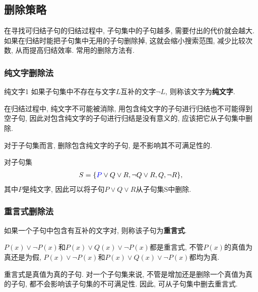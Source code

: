 \subsection{删除策略}
在寻找可归结子句的归结过程中, 子句集中的子句越多, 需要付出的代价就会越大. 如果在归结时能把子句集中无用的子句删除掉, 这就会缩小搜索范围, 减少比较次数, 从而提高归结效率.
常用的删除方法有.
\subsubsection{纯文字删除法}
\begin{mydef}{纯文字}{1}
    如果子句集中不存在与文字$L$互补的文字$\neg L$, 则称该文字为\textbf{纯文字}.
\end{mydef}

\begin{remark}
    在归结过程中, 纯文字不可能被消除, 用包含纯文字的子句进行归结也不可能得到空子句, 因此对包含纯文字的子句进行归结是没有意义的, 应该把它从子句集中删除.
\end{remark}
\begin{remark}
    对于子句集而言, 删除包含纯文字的子句, 是不影响其不可满足性的.
\end{remark}

\begin{example}
对子句集
\begin{align}
    S=\{\textcolor[rgb]{0,0,1}{P}\vee Q\vee R, \neg Q\vee R,  Q, \neg R\},
\end{align}
其中$P$是纯文字, 因此可以将子句$P\vee Q\vee R$从子句集S中删除.
\end{example}
\subsubsection{重言式删除法}
    如果一个子句中包含有互补的文字对, 则称该子句为\textbf{重言式}.
\begin{example}
    $P(x)\vee \neg P(x)$和$P(x)\vee Q(x)\vee \neg P(x)$都是重言式, 不管$P(x)$的真值为真还是为假, $P(x)\vee \neg P(x)$和$P(x)\vee Q(x)\vee \neg P(x)$都均为真.
\end{example}

重言式是真值为真的子句. 对一个子句集来说, 不管是增加还是删除一个真值为真的子句, 都不会影响该子句集的不可满足性. 因此, 可从子句集中删去重言式.
